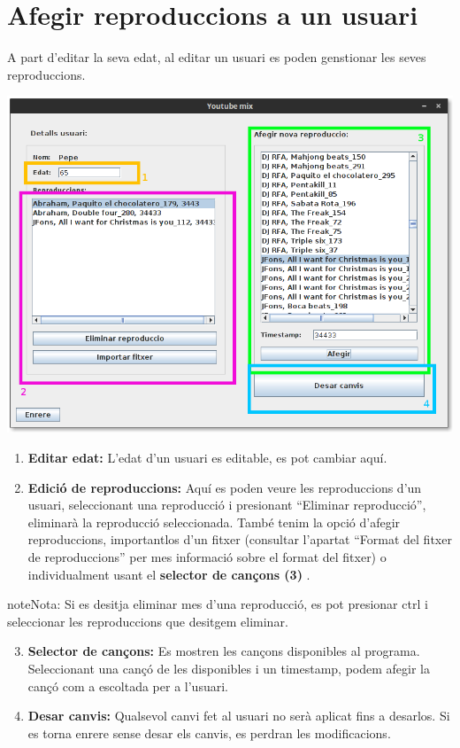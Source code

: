 \documentclass[a4paper,10pt,oneside]{sphinxmanual}
\begin{document}
\section{Afegir reproduccions a un usuari}
\label{gest_usuaris:afegir-reproduccions-a-un-usuari}
A part d'editar la seva edat, al editar un usuari es poden genstionar les seves reproduccions.

\includegraphics{edit_usr.png}
\begin{enumerate}
\item {} 
\textbf{Editar edat:} L'edat d'un usuari es editable, es pot cambiar aquí.

\item {} 
\textbf{Edició de reproduccions:} Aquí es poden veure les reproduccions d'un usuari, seleccionant una reproducció i presionant ``Eliminar reproducció'', eliminarà la reproducció seleccionada. També tenim la opció d'afegir reproduccions, importantlos d'un fitxer (consultar l'apartat ``Format del fitxer de reproduccions'' per mes informació sobre el format del fitxer) o individualment usant el \textbf{selector de cançons (3)} .

\end{enumerate}

\begin{notice}{note}{Nota:}
Si es desitja eliminar mes d'una reproducció, es pot presionar ctrl i seleccionar les reproduccions que desitgem eliminar.
\end{notice}
\begin{enumerate}
\setcounter{enumi}{2}
\item {} 
\textbf{Selector de cançons:} Es mostren les cançons disponibles al programa. Seleccionant una cançó de les disponibles i un timestamp, podem afegir la cançó com a escoltada per a l'usuari.

\item {} 
\textbf{Desar canvis:} Qualsevol canvi fet al usuari no serà aplicat fins a desarlos. Si es torna enrere sense desar els canvis, es perdran les modificacions.

\end{enumerate}
\end{document}

